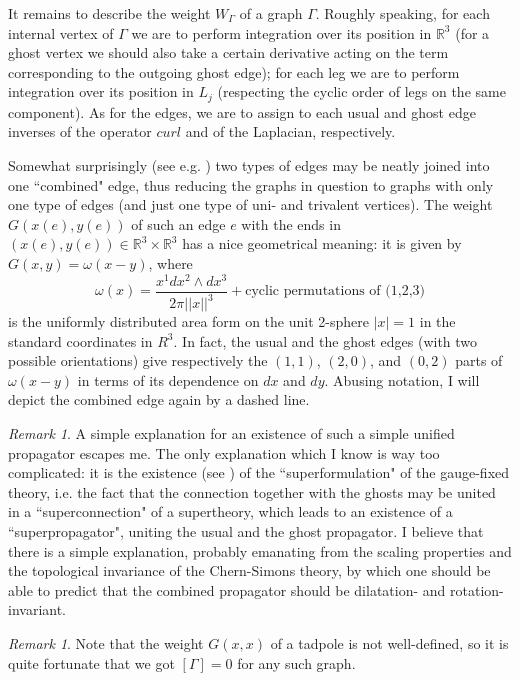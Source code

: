 \documentclass[10pt]{amsart}
\theoremstyle{definition}
\theoremstyle{remark}
\newtheorem{rem}[thm]{Remark}
\newcommand{\R}{\mathbb R}
\newcommand{\GG}{\Gamma}
\newcommand{\Go}{\omega}
\begin{document}
It remains to describe the weight $W_\GG$ of a graph $\GG$.
Roughly speaking, for each internal vertex of $\GG$ we are to
perform integration over its position in $\R^3$ (for a ghost
vertex we should also take a certain derivative acting on the term
corresponding to the outgoing ghost edge); for each leg we are to
perform integration over its position in $L_j$ (respecting the
cyclic order of legs on the same component). As for the edges, we
are to assign to each usual and ghost edge inverses of the
operator $curl$ and of the Laplacian, respectively.

Somewhat surprisingly (see e.g. \cite{GMM}) two types of edges may
be neatly joined into one ``combined" edge, thus reducing the
graphs in question to graphs with only one type of edges (and just
one type of uni- and trivalent vertices). The weight
$G(x(e),y(e))$ of such an edge $e$ with the ends in $(x(e),y(e))
\in \R^3\times\R^3$ has a nice geometrical meaning: it is given by
$G(x,y)=\Go(x-y)$, where $$\Go(x)=\frac{x^1 dx^2 \wedge dx^3}
{2\pi||x||^3}+\text{cyclic permutations of (1,2,3)}$$ is the
uniformly distributed area form on the unit 2-sphere $|x|=1$ in
the standard coordinates in $R^3$. In fact, the usual and the
ghost edges (with two possible orientations) give respectively the
$(1,1)$, $(2,0)$, and $(0,2)$ parts of $\Go(x-y)$ in terms of its
dependence on $dx$ and $dy$. Abusing notation, I will depict the
combined edge again by a dashed line.

\begin{rem}
A simple explanation for an existence of such a simple unified
propagator escapes me. The only explanation which I know is way
too complicated: it is the existence (see \cite{AS}) of the
``superformulation" of the gauge-fixed theory, i.e. the fact
that the connection together with the ghosts may be united in
a ``superconnection" of a supertheory, which leads to an existence
of a ``superpropagator", uniting the usual and the ghost propagator.
I believe that there is a simple explanation, probably emanating
from the scaling properties and the topological invariance of the
Chern-Simons theory, by which one should be able to predict that
the combined propagator should be dilatation- and rotation-invariant.
\end{rem}

\begin{rem}
Note that the weight $G(x,x)$ of a tadpole is not well-defined,
so it is quite fortunate that we got $[\GG]=0$ for any such graph.
\end{rem}
\end{document}
